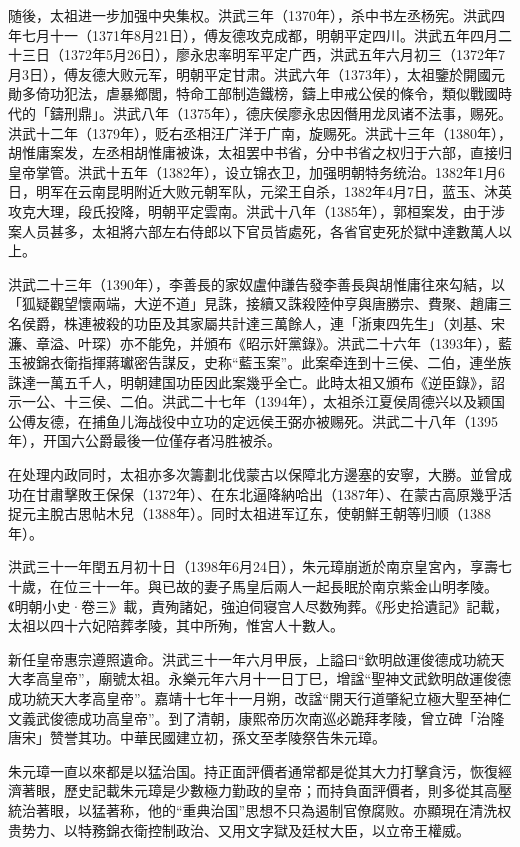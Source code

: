 随後，太祖进一步加强中央集权。洪武三年（1370年），杀中书左丞杨宪。洪武四年七月十一（1371年8月21日），傅友德攻克成都，明朝平定四川。洪武五年四月二十三日（1372年5月26日），廖永忠率明军平定广西，洪武五年六月初三（1372年7月3日），傅友德大败元军，明朝平定甘肃。洪武六年（1373年），太祖鑒於開國元勛多倚功犯法，虐暴鄉閭，特命工部制造鐵榜，鑄上申戒公侯的條令，類似戰國時代的「鑄刑鼎」。洪武八年（1375年），德庆侯廖永忠因僭用龙凤诸不法事，赐死。洪武十二年（1379年），贬右丞相汪广洋于广南，旋赐死。洪武十三年（1380年），胡惟庸案发，左丞相胡惟庸被诛，太祖罢中书省，分中书省之权归于六部，直接归皇帝掌管。洪武十五年（1382年），设立锦衣卫，加强明朝特务统治。1382年1月6日，明军在云南昆明附近大败元朝军队，元梁王自杀，1382年4月7日，蓝玉、沐英攻克大理，段氏投降，明朝平定雲南。洪武十八年（1385年），郭桓案发，由于涉案人员甚多，太祖將六部左右侍郎以下官员皆處死，各省官吏死於獄中達數萬人以上。

洪武二十三年（1390年），李善長的家奴盧仲謙告發李善長與胡惟庸往來勾結，以「狐疑觀望懷兩端，大逆不道」見誅，接續又誅殺陸仲亨與唐勝宗、費聚、趙庸三名侯爵，株連被殺的功臣及其家屬共計達三萬餘人，連「浙東四先生」（刘基、宋濂、章溢、叶琛）亦不能免，并頒布《昭示奸黨錄》。洪武二十六年（1393年），藍玉被錦衣衛指揮蔣瓛密告謀反，史称“藍玉案”。此案牵连到十三侯、二伯，連坐族誅達一萬五千人，明朝建国功臣因此案幾乎全亡。此時太祖又頒布《逆臣錄》，詔示一公、十三侯、二伯。洪武二十七年（1394年），太祖杀江夏侯周德兴以及颖国公傅友德，在捕鱼儿海战役中立功的定远侯王弼亦被赐死。洪武二十八年（1395年），开国六公爵最後一位僅存者冯胜被杀。

在处理内政同时，太祖亦多次籌劃北伐蒙古以保障北方邊塞的安寧，大勝。並曾成功在甘肅擊敗王保保（1372年）、在东北逼降納哈出（1387年）、在蒙古高原幾乎活捉元主脫古思帖木兒（1388年）。同时太祖进军辽东，使朝鮮王朝等归顺（1388年）。

洪武三十一年閏五月初十日（1398年6月24日），朱元璋崩逝於南京皇宮內，享壽七十歲，在位三十一年。與已故的妻子馬皇后兩人一起長眠於南京紫金山明孝陵。《明朝小史·卷三》載，責殉諸妃，強迫伺寝宫人尽数殉葬。《彤史拾遺記》記載，太祖以四十六妃陪葬孝陵，其中所殉，惟宮人十數人。

新任皇帝惠宗遵照遺命。洪武三十一年六月甲辰，上謚曰“欽明啟運俊德成功統天大孝高皇帝”，廟號太祖。永樂元年六月十一日丁巳，增諡“聖神文武欽明啟運俊德成功統天大孝高皇帝”。嘉靖十七年十一月朔，改諡“開天行道肇紀立極大聖至神仁文義武俊德成功高皇帝”。到了清朝，康熙帝历次南巡必跪拜孝陵，曾立碑「治隆唐宋」赞誉其功。中華民國建立初，孫文至孝陵祭告朱元璋。

朱元璋一直以來都是以猛治国。持正面評價者通常都是從其大力打擊貪污，恢復經濟著眼，歷史記載朱元璋是少數極力勤政的皇帝；而持負面評價者，則多從其高壓統治著眼，以猛著称，他的“重典治国”思想不只為遏制官僚腐败。亦顯現在清洗权贵势力、以特務錦衣衛控制政治、又用文字獄及廷杖大臣，以立帝王權威。

